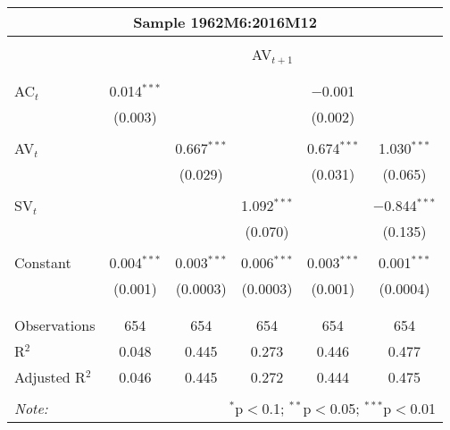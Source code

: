 
\begin{tabular}{lccccc} 
	\multicolumn{6}{c}{Sample 1962M6:2016M12}\\
	\hline\\
	& \multicolumn{5}{c}{AV$_{t+1}$} \\ 
	\\[-1.8ex] 
	\hline \\[-1.8ex] 
 AC$_{t}$ & 0.014$^{***}$ &  &  & $-$0.001 &  \\ 
  & (0.003) &  &  & (0.002) &  \\ 
  & & & & & \\ 
 AV$_{t}$ &  & 0.667$^{***}$ &  & 0.674$^{***}$ & 1.030$^{***}$ \\ 
  &  & (0.029) &  & (0.031) & (0.065) \\ 
  & & & & & \\ 
 SV$_{t}$ &  &  & 1.092$^{***}$ &  & $-$0.844$^{***}$ \\ 
  &  &  & (0.070) &  & (0.135) \\ 
  & & & & & \\ 
 Constant & 0.004$^{***}$ & 0.003$^{***}$ & 0.006$^{***}$ & 0.003$^{***}$ & 0.001$^{***}$ \\ 
  & (0.001) & (0.0003) & (0.0003) & (0.001) & (0.0004) \\ 
  & & & & & \\ 
\hline \\[-1.8ex] 
Observations & 654 & 654 & 654 & 654 & 654 \\ 
R$^{2}$ & 0.048 & 0.445 & 0.273 & 0.446 & 0.477 \\ 
Adjusted R$^{2}$ & 0.046 & 0.445 & 0.272 & 0.444 & 0.475 \\ 
\hline 
\hline \\[-1.8ex] 
\textit{Note:}  & \multicolumn{5}{r}{$^{*}$p$<$0.1; $^{**}$p$<$0.05; $^{***}$p$<$0.01} \\ 
\end{tabular} 
